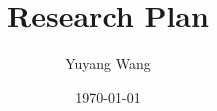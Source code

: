 



\title{Research Plan}

\author{Yuyang Wang}
\date{\today}
\makeatletter
\fancyfoot[L]{\scshape \MakeLowercase{\@author}}
\fancyfoot[R]{{\scshape \MakeLowercase{\@title}}\quad{\LARGE\sfrac{\thepage}{\pageref*{LastPage}}}}
\makeatother



\maketitle%
\thispagestyle{fancy}


\collabCustom{}


\footnotesize


